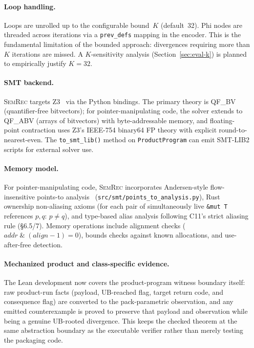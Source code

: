 \documentclass[10pt,a4paper]{article}
\begin{document}
\paragraph{Loop handling.}
Loops are unrolled up to the configurable bound~$K$ (default~32).
Phi nodes are threaded across iterations via a \texttt{prev\_defs}
mapping in the encoder.  This is the fundamental limitation of the
bounded approach: divergences requiring more than $K$ iterations
are missed.  A $K$-sensitivity analysis
(Section~\ref{sec:eval-k}) is planned to empirically justify $K{=}32$.

\paragraph{SMT backend.}
\textsc{SemRec} targets Z3~\cite{demoura2008z3} via the Python
bindings.  The primary theory is QF\_BV (quantifier-free bitvectors);
for pointer-manipulating code, the solver extends to QF\_ABV (arrays
of bitvectors) with byte-addressable memory, and floating-point contraction
uses Z3's IEEE-754 binary64 FP theory with explicit round-to-nearest-even.  The
\texttt{to\_smt\_lib()} method on \texttt{ProductProgram} can
emit SMT-LIB2 scripts for external solver use.

\paragraph{Memory model.}
For pointer-manipulating code, \textsc{SemRec} incorporates
Andersen-style flow-insensitive points-to
analysis~\cite{andersen1994program}
(\texttt{src/smt/points\_to\_analysis.py}), Rust ownership
non-aliasing axioms (for each pair of simultaneously live
\texttt{\&mut T} references $p, q$: $p \neq q$), and type-based
alias analysis following C11's strict aliasing rule (\S6.5/7).
Memory operations include alignment checks ($\mathit{addr}
\;\&\; (\mathit{align} - 1) = 0$), bounds checks against
known allocations, and use-after-free detection.

\paragraph{Mechanized product and class-specific evidence.}
The Lean development now covers the product-program witness boundary itself:
raw product-run facts (payload, UB-reached flag, target return code, and
consequence flag) are converted to the pack-parametric observation, and any
emitted counterexample is proved to preserve that payload and observation while
being a genuine UB-rooted divergence. This keeps the checked theorem at the same
abstraction boundary as the executable verifier rather than merely testing the
packaging code.
\end{document}
